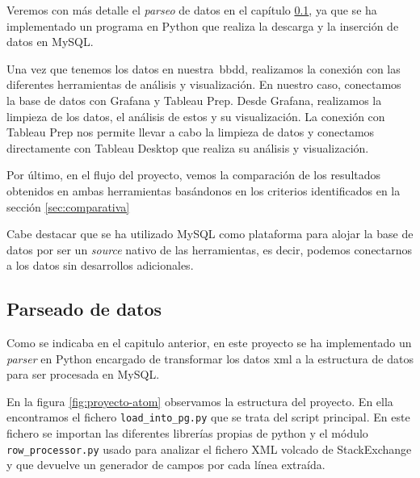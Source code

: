 \documentclass[a4paper, 12pt]{book}
\begin{document}
Veremos con más detalle el \emph{parseo} de datos en el capítulo \ref{sec:parser}, ya que se ha implementado un programa en Python que realiza la descarga y la inserción de datos en MySQL.

Una vez que tenemos los datos en nuestra~\gls{bbdd}, realizamos la conexión con las diferentes herramientas de análisis y visualización. En nuestro caso, conectamos la base de datos con Grafana y Tableau Prep. Desde Grafana, realizamos la limpieza de los datos, el análisis de estos y su visualización. La conexión con Tableau Prep nos permite llevar a cabo la limpieza de datos y conectamos directamente con Tableau Desktop que realiza su análisis y visualización.

Por último, en el flujo del proyecto, vemos la comparación de los resultados obtenidos en ambas herramientas basándonos en los criterios identificados en la sección \ref{sec:comparativa}

Cabe destacar que se ha utilizado MySQL como plataforma para alojar la base de datos por ser un \emph{source} nativo de las herramientas, es decir, podemos conectarnos a los datos sin desarrollos adicionales.

\subsection{Parseado de datos}
\label{sec:parser} 

Como se indicaba en el capitulo anterior, en este proyecto se ha implementado un \emph{parser} en Python encargado de transformar los datos \gls{xml} a la estructura de datos para ser procesada en MySQL. 

En la figura \ref{fig:proyecto-atom} observamos la estructura del proyecto. En ella encontramos el fichero \texttt{load\_into\_pg.py} que se trata del script principal. En este fichero se importan las diferentes librerías propias de python y el módulo \texttt{row\_processor.py} usado para analizar el fichero XML volcado de StackExchange y que devuelve un generador de campos por cada línea extraída. 
\end{document}
